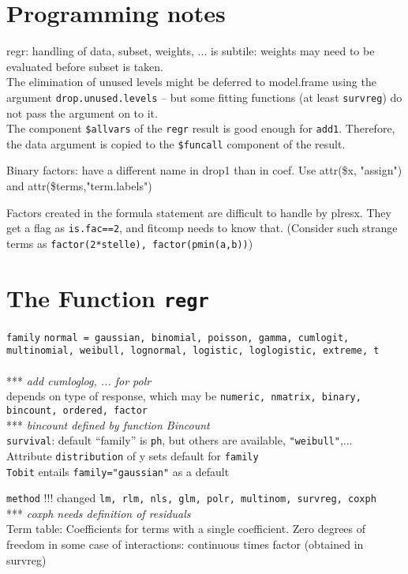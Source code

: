 \documentclass[11pt]{article}
\def\note#1{\\ *** \emph{#1}\\}
\def\T{\texttt}
\begin{document}
\section{Programming notes}
\Itm
regr: handling of data, subset, weights, ...
is subtile: weights may need to be evaluated before subset is taken.\\
The elimination of unused levels might be deferred to model.frame using the
argument \T{drop.unused.levels} -- 
but some fitting functions (at least \T{survreg}) do not pass the argument
on to it.\\
The component \T{\$allvars} of the \T{regr} result is good enough for 
\T{add1}. Therefore, the data argument is copied to the \T{\$funcall}
component of the result.

\Itm %
Binary factors: have a different name in drop1 than in coef.
\Arrow Use attr(\$x, "assign") and attr(\$terms,"term.labels")

\Itm
Factors created in the formula statement are difficult to handle
by plresx. They get a flag as \T{is.fac==2}, and fitcomp needs to know
that.
(Consider such strange terms as \T{factor(2*stelle), factor(pmin(a,b))})

\section{The Function \T{regr}}
\Itm
\T{family} %
\T{normal = gaussian, binomial, poisson, gamma, cumlogit, multinomial,
weibull, lognormal, logistic, loglogistic, extreme, t}\\
\note{add cumloglog, ... for polr}
depends on type of response, which may be
\T{numeric, nmatrix, binary, bincount, ordered, factor}
\note{bincount defined by function Bincount}
\T{survival}: default ``family'' is \T{ph}, but others are available,
\T{"weibull"},...\\
Attribute \T{distribution} of y sets default for \T{family}\\
\T{Tobit} entails \T{family="gaussian"} as a default

\Itm
\T{method} !!! changed
\T{lm, rlm, nls, glm, polr, multinom, survreg, coxph}
\note{coxph needs definition of residuals}

Term table:
Coefficients for terms with a single coefficient.
Zero degrees of freedom in some case of interactions: continuous times
factor (obtained in survreg)
\end{document}
